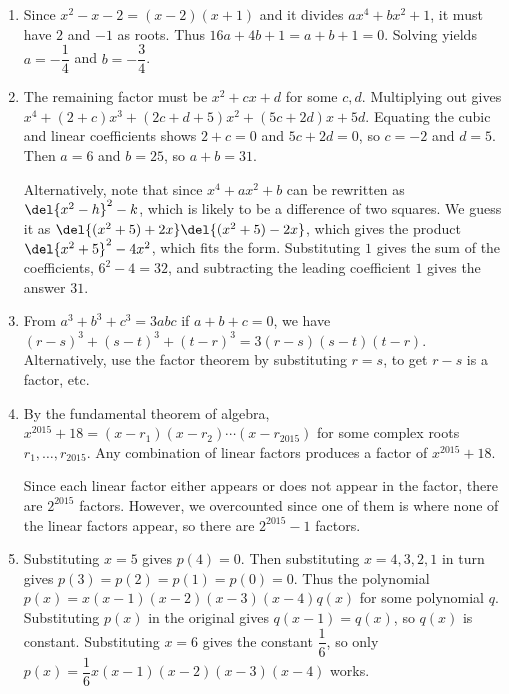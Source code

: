 \documentclass[10pt,paper=letter]{scrartcl}
\begin{document}
\begin{enumerate}

\item Since $x^2 - x - 2 = (x - 2)(x + 1)$ and it divides $ax^4 + bx^2 + 1$, it must have $2$ and $-1$ as roots. Thus $16a + 4b + 1 = a + b + 1 = 0$. Solving yields $a = -\dfrac14$ and $b = -\dfrac34$.

\item The remaining factor must be $x^2 + cx + d$ for some $c, d$. Multiplying out gives $x^4 + (2 + c)x^3 + (2c + d + 5)x^2 + (5c + 2d)x + 5d$. Equating the cubic and linear coefficients shows $2 + c = 0$ and $5c + 2d = 0$, so $c = -2$ and $d = 5$. Then $a = 6$ and $b = 25$, so $a + b = 31$. 

Alternatively, note that since $x^4 + ax^2 + b$ can be rewritten as $\del{x^2 - h}^2 - k$, which is likely to be a difference of two squares. We guess it as $\del{(x^2 + 5) + 2x}\del{(x^2 + 5) - 2x}$, which gives the product $\del{x^2 + 5}^2 - 4x^2$, which fits the form. Substituting $1$ gives the sum of the coefficients, $6^2 - 4 = 32$, and subtracting the leading coefficient $1$ gives the answer $31$.

\item From $a^3 + b^3 + c^3 = 3abc$ if $a + b + c = 0$, we have $(r-s)^3 + (s-t)^3 + (t-r)^3 = 3(r-s)(s-t)(t-r)$. Alternatively, use the factor theorem by substituting $r = s$, to get $r - s$ is a factor, etc.

\item By the fundamental theorem of algebra, $x^{2015} + 18 = (x - r_1)(x - r_2) \cdots (x - r_{2015})$ for some complex roots $r_1, \ldots, r_{2015}$. Any combination of linear factors produces a factor of $x^{2015} + 18$.

Since each linear factor either appears or does not appear in the factor, there are $2^{2015}$ factors. However, we overcounted since one of them is where none of the linear factors appear, so there are $2^{2015} - 1$ factors.

\item Substituting $x = 5$ gives $p(4) = 0$. Then substituting $x = 4, 3, 2, 1$ in turn gives $p(3) = p(2) = p(1) = p(0) = 0$. Thus the polynomial $p(x) = x(x-1)(x-2)(x-3)(x-4)q(x)$ for some polynomial $q$. Substituting $p(x)$ in the original gives $q(x-1) = q(x)$, so $q(x)$ is constant. Substituting $x = 6$ gives the constant $\dfrac16$, so only $p(x) = \dfrac16x(x-1)(x-2)(x-3)(x-4)$ works.

\end{enumerate}
\end{document}
